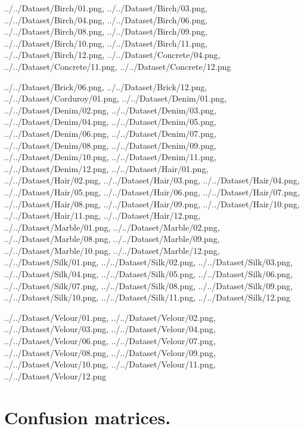 \documentclass[12pt,a4paper]{article}
\begin{document}
\begin{singlespace}
{../../Dataset/Birch/01.png,
../../Dataset/Birch/03.png,
../../Dataset/Birch/04.png,
../../Dataset/Birch/06.png,
../../Dataset/Birch/08.png,
../../Dataset/Birch/09.png,
../../Dataset/Birch/10.png,
../../Dataset/Birch/11.png,
../../Dataset/Birch/12.png,
../../Dataset/Concrete/04.png,
../../Dataset/Concrete/11.png,
../../Dataset/Concrete/12.png}

{../../Dataset/Brick/06.png,
../../Dataset/Brick/12.png,
../../Dataset/Corduroy/01.png,
../../Dataset/Denim/01.png,
../../Dataset/Denim/02.png,
../../Dataset/Denim/03.png,
../../Dataset/Denim/04.png,
../../Dataset/Denim/05.png,
../../Dataset/Denim/06.png,
../../Dataset/Denim/07.png,
../../Dataset/Denim/08.png,
../../Dataset/Denim/09.png,
../../Dataset/Denim/10.png,
../../Dataset/Denim/11.png,
../../Dataset/Denim/12.png,
../../Dataset/Hair/01.png,
../../Dataset/Hair/02.png,
../../Dataset/Hair/03.png,
../../Dataset/Hair/04.png,
../../Dataset/Hair/05.png,
../../Dataset/Hair/06.png,
../../Dataset/Hair/07.png,
../../Dataset/Hair/08.png,
../../Dataset/Hair/09.png,
../../Dataset/Hair/10.png,
../../Dataset/Hair/11.png,
../../Dataset/Hair/12.png,
../../Dataset/Marble/01.png,
../../Dataset/Marble/02.png,
../../Dataset/Marble/08.png,
../../Dataset/Marble/09.png,
../../Dataset/Marble/10.png,
../../Dataset/Marble/12.png,
../../Dataset/Silk/01.png,
../../Dataset/Silk/02.png,
../../Dataset/Silk/03.png,
../../Dataset/Silk/04.png,
../../Dataset/Silk/05.png,
../../Dataset/Silk/06.png,
../../Dataset/Silk/07.png,
../../Dataset/Silk/08.png,
../../Dataset/Silk/09.png,
../../Dataset/Silk/10.png,
../../Dataset/Silk/11.png,
../../Dataset/Silk/12.png}

{../../Dataset/Velour/01.png,
../../Dataset/Velour/02.png,
../../Dataset/Velour/03.png,
../../Dataset/Velour/04.png,
../../Dataset/Velour/06.png,
../../Dataset/Velour/07.png,
../../Dataset/Velour/08.png,
../../Dataset/Velour/09.png,
../../Dataset/Velour/10.png,
../../Dataset/Velour/11.png,
../../Dataset/Velour/12.png}

\newpage
\section{Confusion matrices.}

\newcommand{\confusionSize}{1}
\newcommand{\plotconfusion}[2]
{
    \begin{figure}[!ht]
        \centering
        \texttt{[image: \#1]}
        \caption{#2}
    \end{figure}
    \FloatBarrier
}


\end{singlespace}
\end{document}
